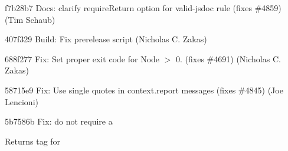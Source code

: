 \begin{DoxyItemize}
\item f7b28b7 Docs\+: clarify {\ttfamily require\+Return} option for valid-\/jsdoc rule (fixes \#4859) (Tim Schaub)
\item 407f329 Build\+: Fix prerelease script (Nicholas C. Zakas)
\item 688f277 Fix\+: Set proper exit code for Node \texorpdfstring{$>$}{>} 0. (fixes \#4691) (Nicholas C. Zakas)
\item 58715e9 Fix\+: Use single quotes in context.\+report messages (fixes \#4845) (Joe Lencioni)
\item 5b7586b Fix\+: do not require a \begin{DoxyReturn}{Returns}
tag for 
\end{DoxyReturn}

\end{DoxyItemize}